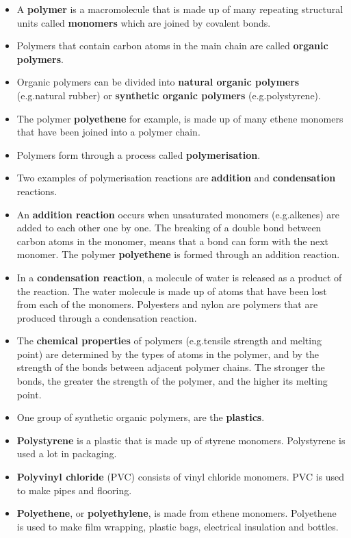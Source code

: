 \begin{itemize}
\item{A \textbf{polymer} is a macromolecule that is made up of many repeating structural units called \textbf{monomers} which are joined by covalent bonds.}
\item{Polymers that contain carbon atoms in the main chain are called \textbf{organic polymers}.}
\item{Organic polymers can be divided into \textbf{natural organic polymers} (e.g.\@ natural rubber) or \textbf{synthetic organic polymers} (e.g.\@ polystyrene).}
\item{The polymer \textbf{polyethene} for example, is made up of many ethene monomers that have been joined into a polymer chain.}
\item{Polymers form through a process called \textbf{polymerisation}.}
\item{Two examples of polymerisation reactions are \textbf{addition} and \textbf{condensation} reactions.}
\item{An \textbf{addition reaction} occurs when unsaturated monomers (e.g.\@ alkenes) are added to each other one by one. The breaking of a double bond between carbon atoms in the monomer, means that a bond can form with the next monomer. The polymer \textbf{polyethene} is formed through an addition reaction.}
\item{In a \textbf{condensation reaction}, a molecule of water is released as a product of the reaction. The water molecule is made up of atoms that have been lost from each of the monomers. Polyesters and nylon are polymers that are produced through a condensation reaction.}
\item{The \textbf{chemical properties} of polymers (e.g.\@ tensile strength and melting point) are determined by the types of atoms in the polymer, and by the strength of the bonds between adjacent polymer chains. The stronger the bonds, the greater the strength of the polymer, and the higher its melting point.}
\item{One group of synthetic organic polymers, are the \textbf{plastics}.}
\item{\textbf{Polystyrene} is a plastic that is made up of styrene monomers. Polystyrene is used a lot in packaging.}
\item{\textbf{Polyvinyl chloride} (PVC) consists of vinyl chloride monomers. PVC is used to make pipes and flooring.}
\item{\textbf{Polyethene}, or \textbf{polyethylene}, is made from ethene monomers. Polyethene is used to make film wrapping, plastic bags, electrical insulation and bottles.}

\end{itemize}
